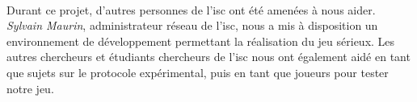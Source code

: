 \paragraph{}Durant ce projet, d'autres personnes de l'\gls{isc} ont été amenées à nous aider. \emph{Sylvain Maurin}, administrateur réseau de l'\gls{isc}, nous a mis à disposition un
environnement de développement permettant la réalisation du jeu sérieux. Les autres chercheurs et étudiants chercheurs de l'\gls{isc} nous ont également aidé en tant que sujets sur
le protocole expérimental, puis en tant que joueurs pour tester notre jeu.
